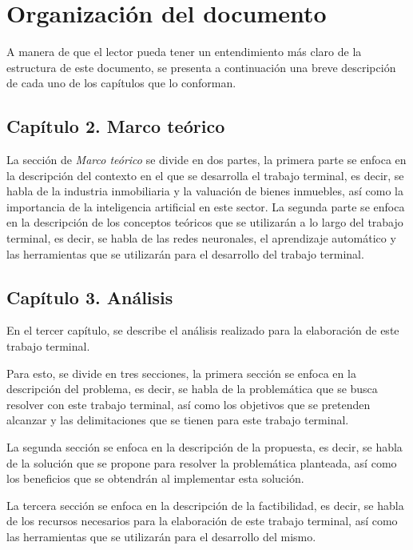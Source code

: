\section{Organización del documento}

A manera de que el lector pueda tener un entendimiento más claro de la estructura
de este documento, se presenta a continuación una breve descripción de cada uno
de los capítulos que lo conforman.

\subsection*{Capítulo 2. Marco teórico}

La sección de \textit{Marco teórico} se divide en dos partes, la primera parte
se enfoca en la descripción del contexto en el que se desarrolla el trabajo
terminal, es decir, se habla de la industria inmobiliaria y la valuación de
bienes inmuebles, así como la importancia de la inteligencia artificial en este
sector. La segunda parte se enfoca en la descripción de los conceptos teóricos
que se utilizarán a lo largo del trabajo terminal, es decir, se habla de las
redes neuronales, el aprendizaje automático y las herramientas que se utilizarán
para el desarrollo del trabajo terminal.

\subsection*{Capítulo 3. Análisis}

En el tercer capítulo, se describe el análisis realizado para la elaboración de
este trabajo terminal.

Para esto, se divide en tres secciones, la primera sección se enfoca en la
descripción del problema, es decir, se habla de la problemática que se busca
resolver con este trabajo terminal, así como los objetivos que se pretenden
alcanzar y las delimitaciones que se tienen para este trabajo terminal.

La segunda sección se enfoca en la descripción de la propuesta, es decir, se
habla de la solución que se propone para resolver la problemática planteada,
así como los beneficios que se obtendrán al implementar esta solución.

La tercera sección se enfoca en la descripción de la factibilidad, es decir, se
habla de los recursos necesarios para la elaboración de este trabajo terminal,
así como las herramientas que se utilizarán para el desarrollo del mismo.

